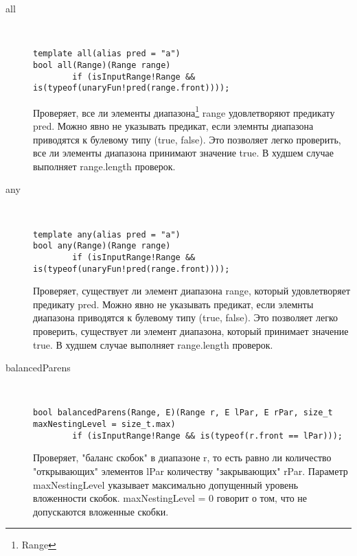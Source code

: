 \documentclass[12pt]{article}
\begin{document}
\begin{description}
\item [all] \hfill \\
\begin{verbatim}
template all(alias pred = "a")
bool all(Range)(Range range) 
        if (isInputRange!Range && is(typeof(unaryFun!pred(range.front))));
\end{verbatim}

Проверяет, все ли элементы диапазона\footnote{Range} range удовлетворяют предикату pred. 
Можно явно не указывать предикат, если элемнты диапазона приводятся к булевому типу (true, false). Это позволяет легко проверить,
все ли элементы диапазона принимают значение true. В худшем случае выполняет range.length проверок.
\item [any] \hfill \\
\begin{verbatim}
template any(alias pred = "a")
bool any(Range)(Range range) 
        if (isInputRange!Range && is(typeof(unaryFun!pred(range.front))));
\end{verbatim}

Проверяет, существует ли элемент диапазона range, который удовлетворяет предикату pred. 
Можно явно не указывать предикат, если элемнты диапазона приводятся к булевому типу (true, false). Это позволяет легко проверить,
существует ли элемент диапазона, который принимает значение true. В худшем случае выполняет range.length проверок.
\item [balancedParens] \hfill \\
\begin{verbatim}
bool balancedParens(Range, E)(Range r, E lPar, E rPar, size_t maxNestingLevel = size_t.max)
        if (isInputRange!Range && is(typeof(r.front == lPar)));
\end{verbatim}
Проверяет, "баланс скобок" в диапазоне r, то есть равно ли количество "открывающих" 
элементов lPar количеству "закрывающих" rPar. Параметр maxNestingLevel указывает максимально допущенный уровень вложенности
скобок. maxNestingLevel = 0 говорит о том, что не допускаются вложенные скобки.


\end{description}
\end{document}
